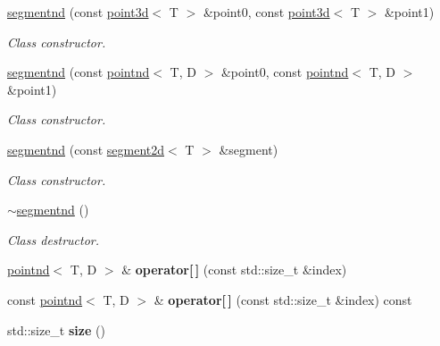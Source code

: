 \begin{DoxyCompactItemize}
\hyperlink{classacme_1_1segmentnd_a806b9abc096ae1dd9e94c88b3a8f0e97}{segmentnd} (const \hyperlink{classacme_1_1point3d}{point3d}$<$ T $>$ \&point0, const \hyperlink{classacme_1_1point3d}{point3d}$<$ T $>$ \&point1)
\begin{DoxyCompactList}\small\item\em Class constructor. \end{DoxyCompactList}\item 
\hyperlink{classacme_1_1segmentnd_a0f6c38e8fe244f629a0f34a3451f8ead}{segmentnd} (const \hyperlink{classacme_1_1pointnd}{pointnd}$<$ T, D $>$ \&point0, const \hyperlink{classacme_1_1pointnd}{pointnd}$<$ T, D $>$ \&point1)
\begin{DoxyCompactList}\small\item\em Class constructor. \end{DoxyCompactList}\item 
\hyperlink{classacme_1_1segmentnd_a4afa0be2c691e1c8a7239f547879538f}{segmentnd} (const \hyperlink{classacme_1_1segment2d}{segment2d}$<$ T $>$ \&segment)
\begin{DoxyCompactList}\small\item\em Class constructor. \end{DoxyCompactList}\item 
\mbox{\label{classacme_1_1segmentnd_a128c5e8c6b324590001b44bbd1df376d}} 
\hyperlink{classacme_1_1segmentnd_a128c5e8c6b324590001b44bbd1df376d}{$\sim$segmentnd} ()
\begin{DoxyCompactList}\small\item\em Class destructor. \end{DoxyCompactList}\item 
\mbox{\label{classacme_1_1segmentnd_a8635bff51cdc526e812cf1d49f74054b}} 
\hyperlink{classacme_1_1pointnd}{pointnd}$<$ T, D $>$ \& {\bfseries operator\mbox{[}$\,$\mbox{]}} (const std\+::size\+\_\+t \&index)
\item 
\mbox{\label{classacme_1_1segmentnd_a1b40e0a378245df5db64af1e4ec262ab}} 
const \hyperlink{classacme_1_1pointnd}{pointnd}$<$ T, D $>$ \& {\bfseries operator\mbox{[}$\,$\mbox{]}} (const std\+::size\+\_\+t \&index) const
\item 
\mbox{\label{classacme_1_1segmentnd_a844a5fbdb6cb3fc4a8bfcd98039e235e}} 
std\+::size\+\_\+t {\bfseries size} ()
\end{DoxyCompactItemize}



